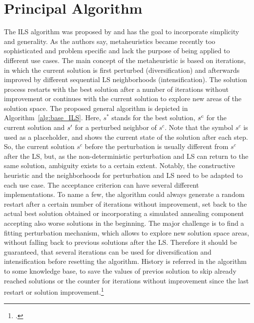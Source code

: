 \section{Principal Algorithm}
\label{sec:algorithm}
The \gls{ILS} algorithm was proposed by \cite{lourenco_iterated_2003} and has the goal to incorporate simplicity and generality.
As the authors say, metaheuristics became recently too sophisticated and problem specific and lack the purpose of
being applied to different use cases. The main concept of the metaheuristic is based on iterations, in which the current
solution is first perturbed (diversification) and afterwards improved by different sequential \gls{LS} neighborhoods
(intensification). The solution process restarts with the best solution after a number of iterations without improvement
or continues with the current solution to explore new areas of the solution space.
The proposed general algorithm is depicted in Algorithm~\ref{alg:base_ILS}. Here, $s^*$ stands for the best solution,
$s\sp{c}$ for the current solution and $s\sp{\prime}$ for a perturbed neighbor of $s^c$. Note that the symbol $s^c$
is used as a placeholder, and shows the current state of the solution after each step. So, the current solution
$s^c$ before the perturbation is usually different from $s^c$ after the \gls{LS}, but, as the non-deterministic
perturbation and \gls{LS} can return to the same solution, ambiguity exists to a certain extent.
Notably, the constructive heuristic and the neighborhoods for perturbation and \gls{LS} need to be adapted to
each use case. The acceptance criterion can have several different implementations. To name a few, the algorithm could always
generate a random restart after a certain number of iterations without improvement, set back to the actual best solution
obtained or incorporating a simulated annealing component accepting also worse solutions in the beginning. The major challenge is
to find a fitting perturbation mechanism, which allows to explore new solution space areas, without falling back to previous solutions
after the \gls{LS}. Therefore it should be guaranteed, that several iterations can be used for diversification and
intensification before resetting the algorithm. History is referred in the algorithm to some knowledge base,
to save the values of previos solution to skip already reached solutions or the counter for iterations without improvement since the
last restart or solution improvement.\footcite[cf.][]{lourenco_iterated_2003}


